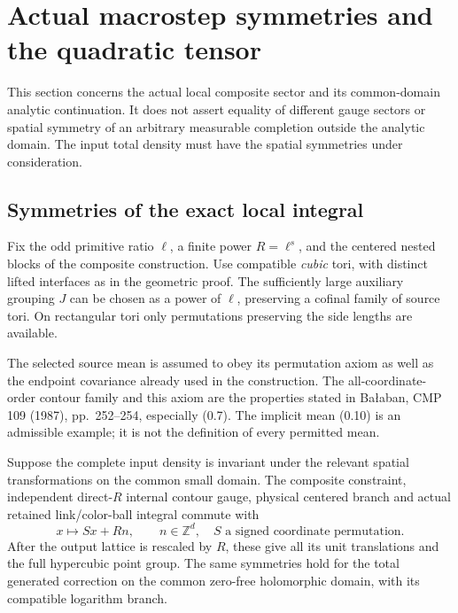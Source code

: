 \section{Actual macrostep symmetries and the quadratic tensor}
\label{msy-section}

This section concerns the actual local composite sector and its
common-domain analytic continuation. It does not assert equality of
different gauge sectors or spatial symmetry of an arbitrary measurable
completion outside the analytic domain. The input total density must
have the spatial symmetries under consideration.

\subsection{Symmetries of the exact local integral}
\label{msy-integral-section}

Fix the odd primitive ratio \(\ell\), a finite power \(R=\ell^s\), and
the centered nested blocks of the composite construction. Use compatible
\emph{cubic} tori, with distinct lifted interfaces as in the geometric
proof. The sufficiently large auxiliary grouping \(J\) can be chosen
as a power of \(\ell\), preserving a cofinal family of source tori.
On rectangular tori only permutations preserving the side lengths
are available.

The selected source mean is assumed to obey its permutation axiom
as well as the endpoint covariance already used in the construction.
The all-coordinate-order contour family and this axiom are the
properties stated in Ba{\l}aban, CMP 109 (1987), pp.~252--254,
especially (0.7). The implicit mean (0.10) is an admissible example;
it is not the definition of every permitted mean.

\begin{proposition}
\label{msy-spatial-proposition}
Suppose the complete input density is invariant under the relevant
spatial transformations on the common small domain. The composite
constraint, independent direct-\(R\) internal contour gauge, physical
centered branch and actual retained link/color-ball integral commute
with
\begin{equation}
 x\longmapsto Sx+Rn,\qquad
 n\in\mathbb Z^d,\quad
 S\text{ a signed coordinate permutation}.
 \label{msy-space-group}
\end{equation}
After the output lattice is rescaled by \(R\), these give all its unit
translations and the full hypercubic point group. The same symmetries
hold for the total generated correction on the common zero-free
holomorphic domain, with its compatible logarithm branch.
\end{proposition}

